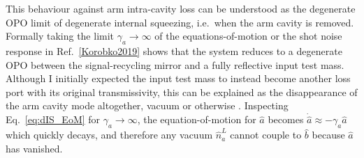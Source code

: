This behaviour against arm intra-cavity loss can be understood as the degenerate OPO limit of degenerate internal squeezing, i.e.\ when the arm cavity is removed. Formally taking the limit $\gamma_a\rightarrow\infty$ of the equations-of-motion or the shot noise response in Ref.~\ref{Korobko2019} shows that the system reduces to a degenerate OPO between the signal-recycling mirror and a fully reflective input test mass.  Although I initially expected the input test mass to instead become another loss port with its original transmissivity, this can be explained as the disappearance of the arm cavity mode altogether, vacuum or otherwise . Inspecting Eq.~\ref{eq:dIS_EoM} for $\gamma_a\rightarrow\infty$, the equation-of-motion for $\hat a$ becomes $\dot{\hat a}\approx -\gamma_a \hat a$ which quickly decays, and therefore any vacuum $\hat n^L_a$ cannot couple to $\hat b$ because $\hat a$ has vanished.



